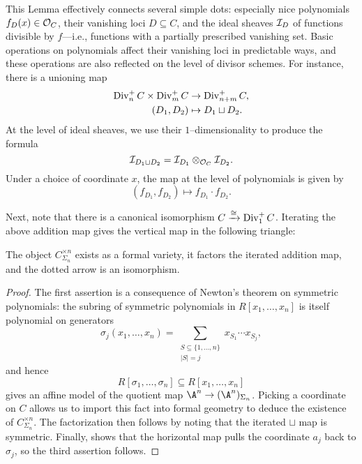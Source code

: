 \begin{remark}\label{DescriptionOfSqCupMapOnPolynomials}
This Lemma effectively connects several simple dots: especially nice polynomials $f_D(x) \in \mathcal{O}_C$, their vanishing loci $D \subseteq C$, and the ideal sheaves $\mathcal{I}_D$ of functions divisible by $f$---i.e., functions with a partially prescribed vanishing set.  Basic operations on polynomials affect their vanishing loci in predictable ways, and these operations are also reflected on the level of divisor schemes.  For instance, there is a unioning map
\begin{align*}
\operatorname{Div}_n^+ C \times \operatorname{Div}_m^+ C & \to \operatorname{Div}_{n+m}^+ C, \\
(D_1, D_2) & \mapsto D_1 \sqcup D_2.
\end{align*}
At the level of ideal sheaves, we use their $1$--dimensionality to produce the formula \[\mathcal{I}_{D_1 \sqcup D_2} = \mathcal{I}_{D_1} \otimes_{\mathcal{O}_C} \mathcal{I}_{D_2}.\]  Under a choice of coordinate $x$, the map at the level of polynomials is given by \[(f_{D_1}, f_{D_2}) \mapsto f_{D_1} \cdot f_{D_2}.\]
\end{remark}

Next, note that there is a canonical isomorphism $C \xrightarrow{\cong} \operatorname{Div}_1^+ C$.  Iterating the above addition map gives the vertical map in the following triangle:
\begin{center}
\end{center}
\begin{lemma}\label{SymmetricAffinesExist}
The object $C^{\times n}_{\Sigma_n}$ exists as a formal variety, it factors the iterated addition map, and the dotted arrow is an isomorphism.
\end{lemma}
\begin{proof}
The first assertion is a consequence of Newton's theorem on symmetric polynomials: the subring of symmetric polynomials in $R[x_1, \ldots, x_n]$ is itself polynomial on generators \[\sigma_j(x_1, \ldots, x_n) = \sum_{\substack{S \subseteq \{1, \ldots, n\} \\ |S| = j}} x_{S_1} \cdots x_{S_j},\] and hence \[R[\sigma_1, \ldots, \sigma_n] \subseteq R[x_1, \ldots, x_n]\] gives an affine model of the quotient map $\A^n \to (\A^n)_{\Sigma_n}$.  Picking a coordinate on $C$ allows us to import this fact into formal geometry to deduce the existence of $C^{\times n}_{\Sigma_n}$.  The factorization then follows by noting that the iterated $\sqcup$ map is symmetric.  Finally,  shows that the horizontal map pulls the coordinate $a_j$ back to $\sigma_j$, so the third assertion follows.
\end{proof}

